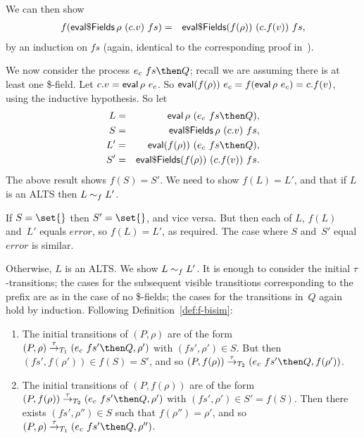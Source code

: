 We can then  show
\begin{eqnarray*} %
f (\evalDollarFields \rho~(c.v)~fs) & = & 
  \evalDollarFields (f(\rho))~(c.f(v))~fs ,
\end{eqnarray*}
%
by an induction on $fs$ (again, identical to the corresponding proof
in~\cite{symmetry-reduction}).

We now consider the process $e_c~ fs \then Q$; recall we are assuming there is
at least one \$-field.  Let $c.v = \mathop{\sf eval} \rho~e_c$.  So $\mathop{\sf eval}
(f(\rho))~e_c = f (\mathop{\sf eval} \rho~e_c) = c.f(v)$, using the inductive
hypothesis.  So let
\begin{eqnarray*}
L & = & \eval \rho ~ (e_c~fs \then Q), \\
S & = & \evalDollarFields \rho ~(c.v)~ fs, \\
L' & = & \eval (f(\rho))~ (e_c~fs \then Q), \\
S' & = & \evalDollarFields (f(\rho)) ~(c.f(v)) ~fs .
\end{eqnarray*}%
%
The above result shows $f(S) = S'$.  We need to show $f(L) = L'$, and that if
$L$ is an ALTS then $L \sim_f L'$.

If $S = \set{}$ then $S' = \set{}$, and vice versa.   But then each of $L$,
$f(L)$ and~$L'$ equals $error$, so $f(L) = L'$, as required.  The case where
$S$ and~$S'$ equal $error$ is similar.

Otherwise, $L$ is an ALTS\@.  We show $L \sim_f L'$.  It is enough to
consider the initial $\tau$-transitions; the cases for the subsequent visible
transitions corresponding to the prefix are as in the case of no \$-fields;
the cases for the transitions in~$Q$ again hold by induction.  Following
Definition~\ref{def:f-bisim}:
%
\begin{enumerate}
\item The initial transitions of $(P,\rho)$ are of the form
$(P,\rho) \trans{\tau}_{T_1} ({e_c~fs' \then Q}, \rho')$ with $(fs',\rho') \in
S$.  But then $(fs', f(\rho')) \in f(S) = S'$, and so
$(P,f(\rho)) \trans{\tau}_{T_2} (e_c~fs' \then Q, f(\rho'))$.

\item The initial transitions of $(P, f(\rho))$ are of the form $(P,
f(\rho)) \trans{\tau}_{T_2} ({e_c~fs' \then Q}, \rho')$ with $(fs',\rho') \in
S' = f(S)$.  Then there exists $(fs',\rho'') \in S$ such that $f(\rho'')
= \rho'$, and so $(P,\rho) \trans{\tau}_{T_1} ({e_c~fs' \then Q}, \rho'')$.
\end{enumerate}




